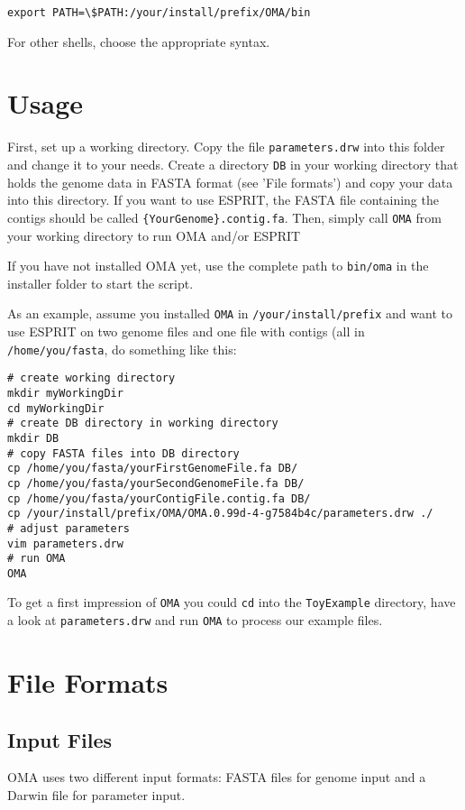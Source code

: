 \documentclass{scrartcl}
\begin{document}
\noindent \begin{verbatim}
export PATH=\$PATH:/your/install/prefix/OMA/bin
\end{verbatim}


\noindent For other shells, choose the appropriate syntax.
\section{Usage}
\noindent First, set up a working directory. Copy the file \texttt{parameters.drw} into this folder and change it to your needs. 
        Create a directory \texttt{DB} in your working directory that holds 
        the genome data in FASTA format (see 'File formats') and copy your 
        data into this directory. If you want to use ESPRIT, the FASTA file 
        containing the contigs should be called \texttt{\{YourGenome\}.contig.fa}. Then, simply call \texttt{OMA} from your working directory to 
        run OMA and/or ESPRIT

\noindent If you have not installed OMA yet, use the complete
        path to \texttt{bin/oma} in the installer folder to start the
        script.

\noindent As an example, assume you installed \texttt{OMA} in \texttt{/your/install/prefix} and want to use ESPRIT on two genome 
        files and one file with contigs (all in \texttt{/home/you/fasta}, do something like this:

\noindent \begin{verbatim}
# create working directory
mkdir myWorkingDir
cd myWorkingDir
# create DB directory in working directory
mkdir DB
# copy FASTA files into DB directory
cp /home/you/fasta/yourFirstGenomeFile.fa DB/
cp /home/you/fasta/yourSecondGenomeFile.fa DB/
cp /home/you/fasta/yourContigFile.contig.fa DB/
cp /your/install/prefix/OMA/OMA.0.99d-4-g7584b4c/parameters.drw ./
# adjust parameters
vim parameters.drw
# run OMA
OMA
\end{verbatim}


\noindent To get a first impression of \texttt{OMA} you 
        could \texttt{cd} into the \texttt{ToyExample} directory, 
        have a look at \texttt{parameters.drw} and run \texttt{OMA} to process our example files.
\section{File Formats}\subsection{Input Files}
\noindent OMA uses two different input formats: FASTA files for 
            genome input and a Darwin file for parameter input.
\end{document}
